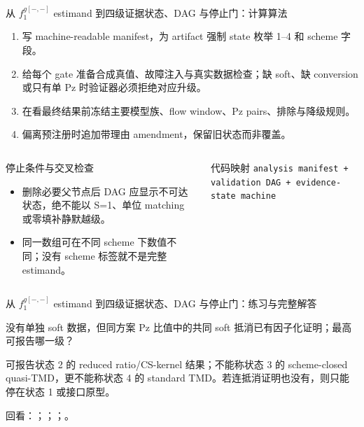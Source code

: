\begin{frame}[t]{从 \ensuremath{f_1^{g[-,-]}} estimand 到四级证据状态、DAG 与停止门：计算算法}
\footnotesize
{}\begin{enumerate}
\item 写 machine-readable manifest，为 artifact 强制 state 枚举 1--4 和 scheme 字段。
\item 给每个 gate 准备合成真值、故障注入与真实数据检查；缺 soft、缺 conversion 或只有单 Pz 时验证器必须拒绝对应升级。
\item 在看最终结果前冻结主要模型族、flow window、Pz pairs、排除与降级规则。
\item 偏离预注册时追加带理由 amendment，保留旧状态而非覆盖。
\end{enumerate}\begin{columns}[T,onlytextwidth]
\begin{block}{停止条件与交叉检查}\scriptsize\begin{itemize}
\item[\CheckMark] 删除必要父节点后 DAG 应显示不可达状态，绝不能以 S=1、单位 matching 或零填补静默越级。
\item[\CheckMark] 同一数组可在不同 scheme 下数值不同；没有 scheme 标签就不是完整 estimand。
\end{itemize}\end{block}
\begin{block}{代码映射}
\scriptsize \texttt{analysis manifest + validation DAG + evidence-state machine}
\end{block}\end{columns}\end{frame}

\begin{frame}[t]{从 \ensuremath{f_1^{g[-,-]}} estimand 到四级证据状态、DAG 与停止门：练习与完整解答}
\footnotesize
\begin{block}{}没有单独 soft 数据，但同方案 Pz 比值中的共同 soft 抵消已有因子化证明；最高可报告哪一级？\end{block}
\begin{exampleblock}{}可报告状态 2 的 reduced ratio/\allowbreak{}CS-kernel 结果；不能称状态 3 的 scheme-closed quasi-TMD，更不能称状态 4 的 standard TMD。若连抵消证明也没有，则只能停在状态 1 或接口原型。\end{exampleblock}
\vfill
\scriptsize 回看：；；；。
\end{frame}

